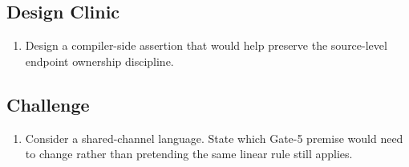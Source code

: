 \subsection*{Design Clinic}
\begin{enumerate}[label=\textbf{5.\arabic*},start=11]
\item Design a compiler-side assertion that would help preserve the source-level endpoint ownership discipline.
\end{enumerate}
\subsection*{Challenge}
\begin{enumerate}[label=\textbf{5.\arabic*},start=12]
\item Consider a shared-channel language. State which Gate-5 premise would need to change rather than pretending the same linear rule still applies.
\end{enumerate}

